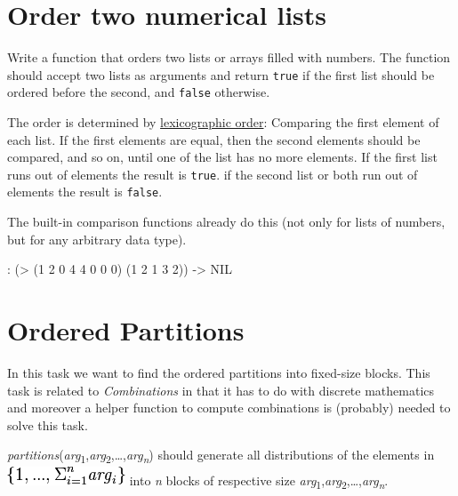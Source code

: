 \pagebreak{}
\section*{Order two numerical lists}

Write a function that orders two lists or arrays filled with numbers.
The function should accept two lists as arguments and return
\texttt{true} if the first list should be ordered before the second,
and \texttt{false} otherwise.

The order is determined by
\href{http://en.wikipedia.org/wiki/Lexicographical\_order\#Ordering\_of\_sequences\_of\_various\_lengths}{lexicographic
order}: Comparing the first element of each list. If the first elements
are equal, then the second elements should be compared, and so on, until
one of the list has no more elements. If the first list runs out of
elements the result is \texttt{true}. if the second list or both run out
of elements the result is \texttt{false}.


\begin{wideverbatim}

The built-in comparison functions already do this (not only for lists of
numbers, but for any arbitrary data type).

: (> (1 2 0 4 4 0 0 0) (1 2 1 3 2))
-> NIL

\end{wideverbatim}

\pagebreak{}
\section*{Ordered Partitions}


In this task we want to find the ordered partitions into fixed-size
blocks. This task is related to \emph{Combinations}
in that it has to do with discrete mathematics and moreover a helper
function to compute combinations is (probably) needed to solve this
task.

\emph{p}\emph{a}\emph{r}\emph{t}\emph{i}\emph{t}\emph{i}\emph{o}\emph{n}\emph{s}(\emph{a}\emph{r}\emph{g}\textsubscript{1},\emph{a}\emph{r}\emph{g}\textsubscript{2},\ldots{},\emph{a}\emph{r}\emph{g}\textsubscript{\emph{n}})
should generate all distributions of the elements in
\includegraphics[scale=.6]{graphics/bc37f835564eb6edd3510913644f4582.png}
into \emph{n} blocks of respective size
\emph{a}\emph{r}\emph{g}\textsubscript{1},\emph{a}\emph{r}\emph{g}\textsubscript{2},\ldots{},\emph{a}\emph{r}\emph{g}\textsubscript{\emph{n}}.

